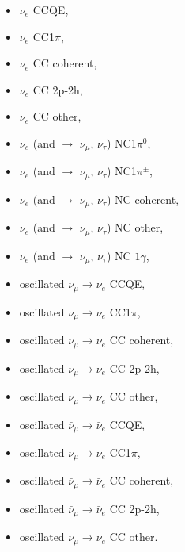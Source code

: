 \begin{itemize}
\item  $\nu_{e}$ CCQE, 
\item  $\nu_{e}$ CC1$\pi$,
\item  $\nu_{e}$ CC coherent,
\item  $\nu_{e}$ CC 2p-2h,
\item  $\nu_{e}$ CC other,

\item  $\nu_{e}$ (and $\rightarrow$ $\nu_{\mu}$, $\nu_{\tau}$) NC1$\pi^{0}$,
\item  $\nu_{e}$ (and $\rightarrow$ $\nu_{\mu}$, $\nu_{\tau}$) NC1$\pi^{\pm}$,
\item  $\nu_{e}$ (and $\rightarrow$ $\nu_{\mu}$, $\nu_{\tau}$) NC coherent,
\item  $\nu_{e}$ (and $\rightarrow$ $\nu_{\mu}$, $\nu_{\tau}$) NC other,
\item  $\nu_{e}$ (and $\rightarrow$ $\nu_{\mu}$, $\nu_{\tau}$) NC $1\gamma$,

\item  oscillated $\nu_{\mu} \rightarrow \nu_{e}$ CCQE,
\item  oscillated $\nu_{\mu} \rightarrow \nu_{e}$ CC1$\pi$,
\item  oscillated $\nu_{\mu} \rightarrow \nu_{e}$ CC coherent,
\item  oscillated $\nu_{\mu} \rightarrow \nu_{e}$ CC 2p-2h,
\item  oscillated $\nu_{\mu} \rightarrow \nu_{e}$ CC other,

\item  oscillated $\bar{\nu}_{\mu} \rightarrow \bar{\nu}_{e}$ CCQE,
\item  oscillated $\bar{\nu}_{\mu} \rightarrow \bar{\nu}_{e}$ CC1$\pi$,
\item  oscillated $\bar{\nu}_{\mu} \rightarrow \bar{\nu}_{e}$ CC coherent,
\item  oscillated $\bar{\nu}_{\mu} \rightarrow \bar{\nu}_{e}$ CC 2p-2h,
\item  oscillated $\bar{\nu}_{\mu} \rightarrow \bar{\nu}_{e}$ CC other.

\end{itemize}

